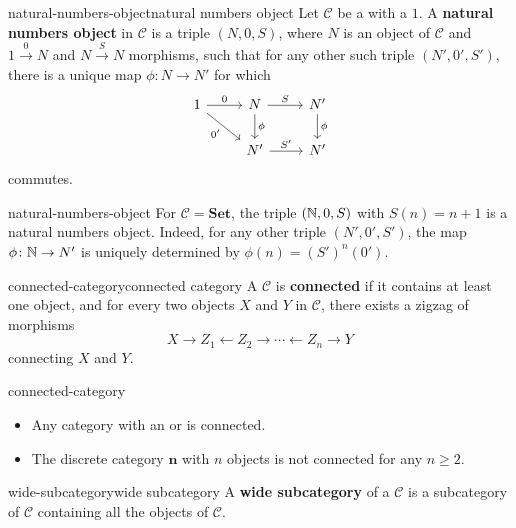 \begin{topic}{natural-numbers-object}{natural numbers object}
    Let $\mathcal{C}$ be a  with a  $1$. A \textbf{natural numbers object} in $\mathcal{C}$ is a triple $(N, 0, S)$, where $N$ is an object of $\mathcal{C}$ and $1 \xrightarrow{0} N$ and $N \xrightarrow{S} N$ morphisms, such that for any other such triple $(N', 0', S')$, there is a unique map $\phi \colon N \to N'$ for which
    \[ \svg \begin{tikzcd} 1 \arrow{r}{0} \arrow[swap]{rd}{0'} & N \arrow{d}{\phi} \arrow{r}{S} & N' \arrow{d}{\phi} \\ & N' \arrow{r}{S'} & N' \end{tikzcd} \]
    commutes.
\end{topic}

\begin{example}{natural-numbers-object}
    For $\mathcal{C} = \textbf{Set}$, the triple $(\mathbb{N}, 0, S)$ with $S(n) = n + 1$ is a natural numbers object. Indeed, for any other triple $(N', 0', S')$, the map $\phi \colon \mathbb{N} \to N'$ is uniquely determined by $\phi(n) = (S')^n(0')$.
\end{example}

\begin{topic}{connected-category}{connected category}
    A  $\mathcal{C}$ is \textbf{connected} if it contains at least one object, and for every two objects $X$ and $Y$ in $\mathcal{C}$, there exists a zigzag of morphisms
    \[ X \rightarrow Z_1 \leftarrow Z_2 \rightarrow \cdots \leftarrow Z_n \rightarrow Y \]
    connecting $X$ and $Y$.
\end{topic}

\begin{example}{connected-category}
    \begin{itemize}
        \item Any category with an  or  is connected.
        \item The discrete category $\textbf{n}$ with $n$ objects is not connected for any $n \ge 2$.
    \end{itemize}
\end{example}

\begin{topic}{wide-subcategory}{wide subcategory}
    A \textbf{wide subcategory} of a  $\mathcal{C}$ is a subcategory of $\mathcal{C}$ containing all the objects of $\mathcal{C}$.
\end{topic}

